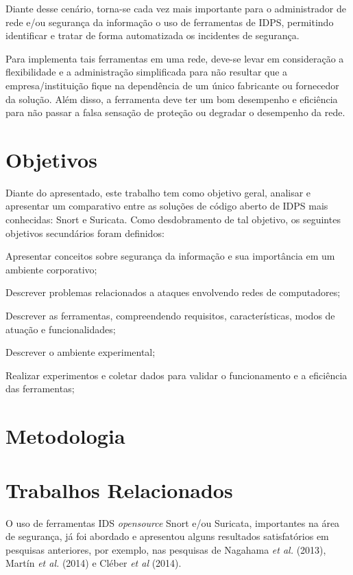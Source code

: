 Diante desse cenário, torna-se cada vez mais importante para o administrador de rede e/ou segurança da informação o uso de ferramentas de IDPS, permitindo identificar e tratar de forma automatizada os incidentes de segurança.

Para implementa tais ferramentas em uma rede, deve-se levar em consideração a flexibilidade e a administração simplificada para não resultar que a empresa/instituição fique na dependência de um único fabricante ou fornecedor da solução. Além disso, a ferramenta deve ter um bom desempenho e eficiência para não passar a falsa sensação de proteção ou degradar o desempenho da rede.

\section{Objetivos} \label{sec:objetivos}

Diante do apresentado, este trabalho tem como objetivo geral, analisar e apresentar um comparativo entre as soluções de código aberto de IDPS mais conhecidas: Snort e Suricata. Como desdobramento de tal objetivo, os seguintes objetivos secundários foram definidos:

\begin{alineas}
\item Apresentar conceitos sobre segurança da informação e sua importância em um ambiente corporativo;
\item Descrever problemas relacionados a ataques envolvendo redes de computadores;
\item Descrever as ferramentas, compreendendo requisitos, características, modos de atuação e funcionalidades;
\item Descrever o ambiente experimental;
\item Realizar experimentos e coletar dados para validar o funcionamento e a eficiência das ferramentas;
\end{alineas}

\section{Metodologia} \label{sec:metodologia}



\section{Trabalhos Relacionados} \label{sec:trabalhos-relacionados}

O uso de ferramentas IDS \textit{opensource} Snort e/ou Suricata, importantes na área de segurança, já foi abordado e apresentou alguns resultados satisfatórios em pesquisas anteriores, por exemplo, nas pesquisas de Nagahama \textit{et al.} (2013), Martín \textit{et al.} (2014) e Cléber \textit{et al} (2014).

